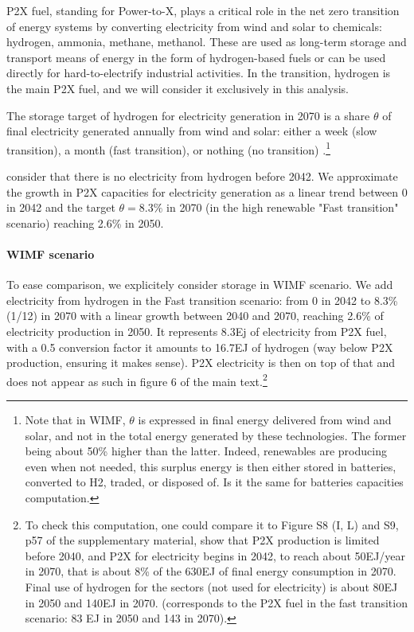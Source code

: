 P2X fuel, standing for Power-to-X, plays a critical role in the net zero transition of energy systems by converting electricity from wind and solar to chemicals: hydrogen, ammonia, methane, methanol. These are used as long-term storage and transport means of energy in the form of hydrogen-based fuels or can be used directly for hard-to-electrify industrial activities. In the transition, hydrogen is the main P2X fuel, and we will consider it exclusively in this analysis.

 The storage target of hydrogen for electricity generation in 2070 is a share $\theta$ of final electricity generated annually from wind and solar: either a week (slow transition), a month (fast transition), or nothing (no transition) \citep{wayEmpiricallyGroundedTechnology2022}.\footnote{\label{footnote_energy_produced}Note that in WIMF, $\theta$ is expressed in final energy delivered from wind and solar, and not in the total energy generated by these technologies. The former being about 50\% higher than the latter. Indeed, renewables are producing even when not needed, this surplus energy is then either stored in batteries, converted to H2, traded, or disposed of. Is it the same for batteries capacities computation.}

\cite{wayEmpiricallyGroundedTechnology2022} consider that there is no electricity from hydrogen before 2042. We approximate the growth in P2X capacities for electricity generation as a linear trend between 0 in 2042 and the target $\theta=8.3\%$ in 2070 (in the high renewable "Fast transition" scenario) reaching 2.6\% in 2050.

\paragraph{WIMF scenario} To ease comparison, we explicitely consider storage in WIMF scenario. We add electricity from hydrogen in the Fast transition scenario: from 0 in 2042 to 8.3\% (1/12) in 2070 with a linear growth between 2040 and 2070, reaching 2.6\% of electricity production in 2050. It represents  8.3Ej of electricity from P2X fuel, with a 0.5 conversion factor it amounts to 16.7EJ of hydrogen (way below P2X production, ensuring it makes sense). P2X electricity is then on top of that and does not appear as such in figure 6 of the main text.\footnote{To check this computation, one could compare it to Figure S8 (I, L) \citep{wayEmpiricallyGroundedTechnology2022} and S9, p57 of the supplementary material, show that P2X production is limited before 2040, and P2X for electricity begins in 2042, to reach about 50EJ/year in 2070, that is about 8\% of the 630EJ of final energy consumption in 2070. Final use of hydrogen for the sectors (not used for electricity) is about 80EJ in 2050 and 140EJ in 2070. (corresponds to the P2X fuel in the fast transition scenario: 83 EJ in 2050 and 143 in 2070).}

